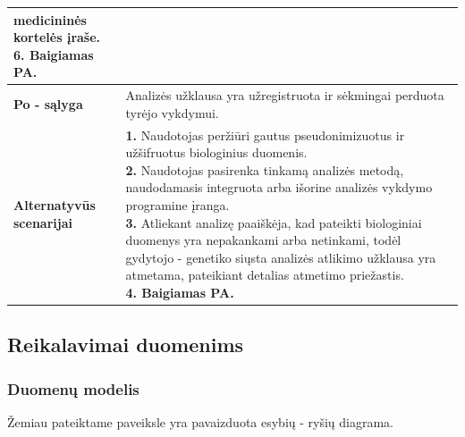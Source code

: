 \documentclass[12pt]{article}
\begin{document}
\begin{table}[htb!]
\begin{tabular}{|m{3cm}|m{13.7cm}|}
{{            medicininės kortelės įraše. \\
            \textbf{6. Baigiamas PA.}
        }}
        \\
        \hline
        \raggedleft \textbf{\cellcolor{deepchampagne}Po - sąlyga} &
        Analizės užklausa yra užregistruota ir sėkmingai perduota tyrėjo
        vykdymui. \\
        \hline
        \raggedleft \textbf{\cellcolor{deepchampagne}Alternatyvūs scenarijai} &
        \vskip 5pt
        \makecell[l]{\parbox[t]{13.7cm}{
            \textbf{1.} \textcolor{dartmouthgreen}{Naudotojas peržiūri gautus
            pseudonimizuotus ir užšifruotus biologinius duomenis.} \\
            \textbf{2.} \textcolor{dartmouthgreen}{Naudotojas pasirenka tinkamą
            analizės metodą, naudodamasis integruota arba išorine analizės
            vykdymo programine įranga.} \\
            \textbf{3.} \textcolor{dartmouthgreen}{Atliekant analizę paaiškėja,
            kad pateikti biologiniai duomenys yra nepakankami arba netinkami,
            todėl gydytojo - genetiko siųsta analizės atlikimo užklausa yra
            atmetama, pateikiant detalias atmetimo priežastis.} \\
            \textbf{4. Baigiamas PA.}
        }}
        \\
        \hline
    \end{tabular}
\end{table}

\newpage

\subsection{Reikalavimai duomenims}
\subsubsection{Duomenų modelis}
Žemiau pateiktame paveiksle yra pavaizduota esybių - ryšių diagrama.
\end{document}
